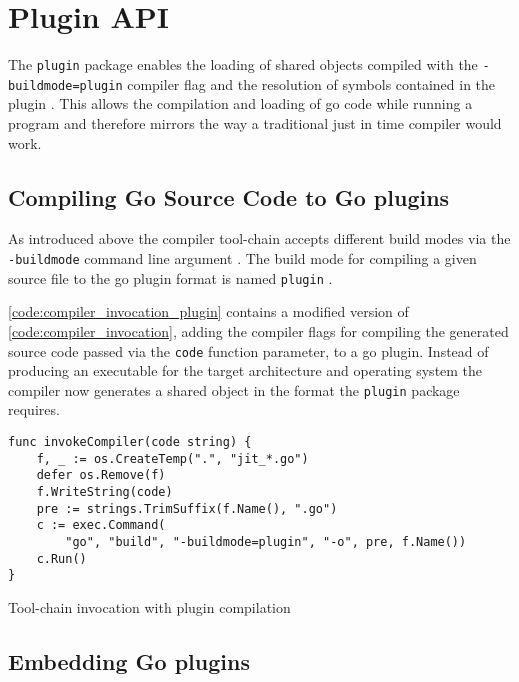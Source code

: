 \chapter{Plugin API}
\label{chapter:plugin-api}

The \texttt{plugin} package enables the loading of shared objects compiled with
the \newline \texttt{-buildmode=plugin} compiler flag and the resolution of
symbols contained in the plugin \cite[Overview]{go_plugin}. This allows the
compilation and loading of go code while running a program and therefore
mirrors the way a traditional just in time compiler would work.

\section{Compiling Go Source Code to Go plugins}

As introduced above the compiler tool-chain accepts different build modes via
the \texttt{-buildmode} command line argument \cite{go_build_mode}. The build
mode for compiling a given source file to the go plugin format is named
\texttt{plugin} \cite{go_build_mode} \cite[Overview]{go_plugin}.

\autoref{code:compiler_invocation_plugin} contains a modified version of
\autoref{code:compiler_invocation}, adding the compiler flags for compiling the
generated source code passed via the \texttt{code} function parameter, to a go
plugin. Instead of producing an executable for the target architecture and
operating system the compiler now generates a shared object in the format the
\texttt{plugin} package requires.

\begin{listing}[H]
    \begin{verbatim}
func invokeCompiler(code string) {
    f, _ := os.CreateTemp(".", "jit_*.go")
    defer os.Remove(f)
    f.WriteString(code)
    pre := strings.TrimSuffix(f.Name(), ".go")
    c := exec.Command(
        "go", "build", "-buildmode=plugin", "-o", pre, f.Name())
    c.Run()
}
    \end{verbatim}
    \caption{Tool-chain invocation with plugin compilation}
    \label{code:compiler_invocation_plugin}
\end{listing}

\section{Embedding Go plugins}
\label{sec:embedding-go-plugins}

